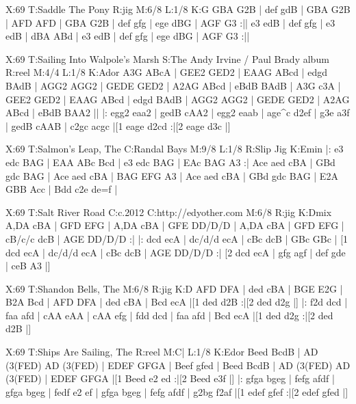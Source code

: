 \documentclass[letterpaper]{article}
\begin{document}
\begin{abc}[name]
X:69
T:Saddle The Pony
R:jig
M:6/8
L:1/8
K:G
GBA G2B | def gdB | GBA G2B | AFD AFD |
GBA G2B | def gfg | ege dBG | AGF G3 :||
e3 edB | def gfg | e3 edB | dBA ABd |
e3 edB | def gfg | ege dBG | AGF G3 :||
\end{abc}

\begin{abc}[name]
X:69
T:Sailing Into Walpole's Marsh
S:The Andy Irvine / Paul Brady album
R:reel
M:4/4
L:1/8
K:Ador
A3G ABcA | GEE2 GED2 | EAAG ABcd | edgd BAdB |
AGG2 AGG2 | GEDE GED2 | A2AG ABcd | eBdB BAdB |
A3G c3A | GEE2 GED2 | EAAG ABcd | edgd BAdB |
AGG2 AGG2 | GEDE GED2 | A2AG ABcd | eBdB BAA2 ||
|: egg2 eaa2 | gedB cAA2 | egg2 eaab | age^c d2ef |
g3e a3f | gedB cAAB | c2gc acgc |[1 eage d2cd :|[2 eage d3c |]
\end{abc}

\begin{abc}[name]
X:69
T:Salmon's Leap, The
C:Randal Bays
M:9/8
L:1/8
R:Slip Jig
K:Emin
|: e3 edc BAG | EAA ABc Bcd | e3 edc BAG | EAc BAG A3 :|
Ace aed cBA | GBd gdc BAG | Ace aed cBA | BAG EFG A3 |
Ace aed cBA | GBd gdc BAG | E2A GBB Acc | Bdd c2e de=f |
\end{abc}

\begin{abc}[name]
X:69
T:Salt River Road
C:c.2012
C:http://edyother.com
M:6/8
R:jig
K:Dmix
A,DA cBA | GFD EFG | A,DA cBA | GFE DD/D/D |
A,DA cBA | GFD EFG | cB/c/c dcB | AGE DD/D/D :|
|: dcd ecA | dc/d/d ecA | cBc dcB | GBc GBc |
[1 dcd ecA | dc/d/d ecA | cBc dcB | AGE DD/D/D :|
[2 dcd ecA | gfg agf | def gde | ceB A3 |]
\end{abc}

\begin{abc}[name]
X:69
T:Shandon Bells, The
M:6/8
R:jig
K:D
AFD DFA | ded cBA | BGE E2G | B2A Bcd |
AFD DFA | ded cBA | Bcd ecA |[1 ded d2B :|[2 ded d2g |]
|: f2d dcd | faa afd | cAA eAA | cAA efg |
fdd dcd | faa afd | Bcd ecA |[1 ded d2g :|[2 ded d2B |]
\end{abc}

\begin{abc}[name]
X:69
T:Ships Are Sailing, The
R:reel
M:C|
L:1/8
K:Edor
Beed BcdB | AD (3(FED) AD (3(FED) | EDEF GFGA | Beef gfed |
Beed BcdB | AD (3(FED) AD (3(FED) | EDEF GFGA |[1 Beed e2 ed :|[2 Beed e3f |]
|: gfga bgeg | fefg afdf | gfga bgeg | fedf e2 ef |
gfga bgeg | fefg afdf | g2bg f2af |[1 edef gfef :|[2 edef gfed |]
\end{abc}
\end{document}
